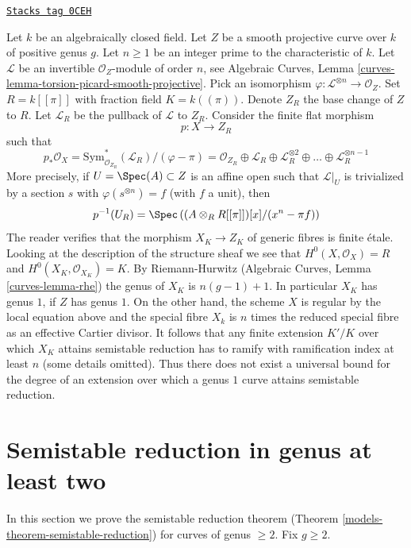 \begin{example}
\label{models-example-extension-necessary-genus-one}
\href{https://stacks.math.columbia.edu/tag/0CEH}{\texttt{Stacks tag 0CEH}}

Let $k$ be an algebraically closed field. Let $Z$ be a smooth projective curve
over $k$ of positive genus $g$. Let $n \geq 1$ be an integer prime to the
characteristic of $k$. Let $\mathcal{L}$ be an
invertible $\mathcal{O}_Z$-module of order $n$, see
Algebraic Curves, Lemma \ref{curves-lemma-torsion-picard-smooth-projective}.
Pick an isomorphism $\varphi : \mathcal{L}^{\otimes n} \to \mathcal{O}_Z$.
Set $R = k[[\pi]]$ with fraction field $K = k((\pi))$. Denote $Z_R$
the base change of $Z$ to $R$. Let $\mathcal{L}_R$
be the pullback of $\mathcal{L}$ to $Z_R$.
Consider the finite flat morphism
$$
p : X \longrightarrow Z_R
$$
such that
$$
p_*\mathcal{O}_X =
\text{Sym}^*_{\mathcal{O}_{Z_R}}(\mathcal{L}_R)/(\varphi - \pi) =
\mathcal{O}_{Z_R} \oplus \mathcal{L}_R \oplus
\mathcal{L}_R^{\otimes 2} \oplus \ldots \oplus \mathcal{L}_R^{\otimes n - 1}
$$
More precisely, if $U = \Spec(A) \subset Z$ is an affine open
such that $\mathcal{L}|_U$ is trivialized by a section $s$
with $\varphi(s^{\otimes n}) = f$ (with $f$ a unit), then
$$
p^{-1}(U_R) = \Spec\left(
(A \otimes_R R[[\pi]])[x]/(x^n - \pi f)
\right)
$$
The reader verifies that the morphism $X_K \to Z_K$ of
generic fibres is finite \'etale. Looking at the description
of the structure sheaf we see that $H^0(X, \mathcal{O}_X) = R$
and $H^0(X_K, \mathcal{O}_{X_K}) = K$. By Riemann-Hurwitz
(Algebraic Curves, Lemma \ref{curves-lemma-rhe})
the genus of $X_K$ is $n(g - 1) + 1$. In particular $X_K$
has genus $1$, if $Z$ has genus $1$.
On the other hand, the scheme $X$ is regular
by the local equation above and the special fibre $X_k$ is
$n$ times the reduced special fibre as an effective Cartier divisor.
It follows that any finite extension $K'/K$ over which
$X_K$ attains semistable reduction has to ramify
with ramification index at least $n$ (some details omitted).
Thus there does not exist a universal bound for the
degree of an extension over which a genus $1$ curve attains
semistable reduction.
\end{example}

\section{Semistable reduction in genus at least two}
\label{models-section-semistable-reduction-genus-at-least-two}
In this section we prove the semistable reduction theorem
(Theorem \ref{models-theorem-semistable-reduction}) for curves of genus $\geq 2$.
Fix $g \geq 2$.

